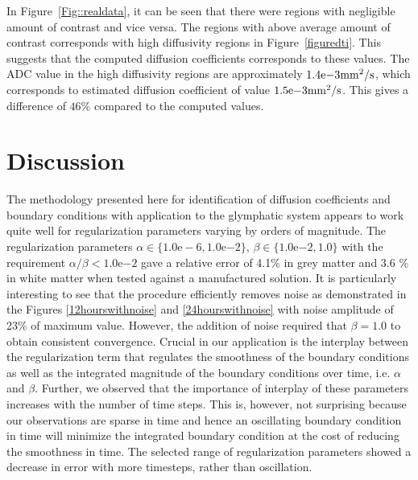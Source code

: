 \documentclass[12pt,a4paper]{article}
\begin{document}
In Figure~\ref{Fig::realdata}, it can be seen that there were regions with negligible amount of contrast and vice versa. The regions with above average amount of contrast corresponds with high diffusivity regions in Figure~\ref{figuredti}. This suggests that the computed diffusion coefficients corresponds to these values. The ADC value in the high diffusivity regions are approximately  $1.4\mathrm{e}{-3} \mathrm{mm\sp{2}/s}$, which corresponds to estimated diffusion coefficient of value $1.5\mathrm{e}{-3} \mathrm{mm\sp{2}/s}$. This gives a difference of $ 46 \%$ compared to the computed values.



\section{Discussion}
The methodology presented here for identification of diffusion coefficients and boundary conditions with application to the glymphatic system appears to work quite 
well for regularization parameters varying by orders of magnitude. The regularization parameters  $\alpha \in \lbrace 1.0\mathrm{e-6}, 1.0\mathrm{e}{-2} \rbrace$, $\beta \in \lbrace 1.0\mathrm{e}{-2} , 1.0 \rbrace$ with the requirement $\alpha / \beta < 1.0\mathrm{e}{-2}$ gave a relative error of  
4.1\% in grey matter and 3.6 \% in white matter when tested against a manufactured solution. It is particularly interesting to see that the procedure efficiently removes noise as demonstrated
in the Figures \ref{12hourswithnoise} and \ref{24hourswithnoise} with noise amplitude of 23\% of maximum value. However, the addition of noise required that $\beta = 1.0 $ to obtain consistent convergence. 
Crucial in our application is the interplay between the regularization term that regulates the smoothness of the boundary conditions as well as the integrated magnitude of the boundary conditions over time, i.e. $\alpha$ and $\beta$. Further, we observed that the importance of interplay of these parameters increases with the number of time steps. This is, however, not surprising because our observations are sparse
in time and hence an oscillating boundary condition in time will minimize the integrated boundary condition at the cost of reducing the smoothness in time. The selected range of regularization parameters showed a decrease in error with more timesteps, rather than oscillation.     
\end{document}
